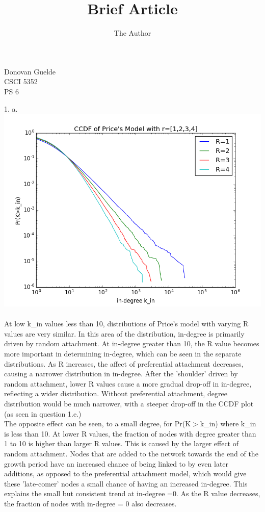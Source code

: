 \documentclass[11pt, oneside]{article}   	%
\title{Brief Article}
\author{The Author}
\begin{document}
\begin{flushright}
Donovan Guelde\\
CSCI 5352\\
PS 6\\
\end{flushright}
1. a.\\
\includegraphics[scale=0.7]{1a_plot.png}\\\\
 \indent At low k\_in values less than 10, distributions of Price's model with varying R values are very similar.  In this area of the distribution, in-degree is primarily driven by random attachment.  At in-degree greater than 10, the R value becomes more important in determining in-degree, which can be seen in the separate distributions.  As R increases, the affect of preferential attachment decreases, causing a narrower distribution in in-degree.  After the 'shoulder' driven by random attachment, lower R values cause a more gradual drop-off in in-degree, reflecting a wider distribution.  Without preferential attachment, degree distribution would be much narrower, with a steeper drop-off in the CCDF plot (as seen in question 1.e.)\\
 \indent The opposite effect can be seen, to a small degree, for Pr(K$>$k\_in) where k\_in is less than 10.  At lower R values, the fraction of nodes with degree greater than 1 to 10 is higher than larger R values.  This is caused by the larger effect of random attachment.  Nodes that are added to the network towards the end of the growth period have an increased chance of being linked to by even later additions, as opposed to the preferential attachment model, which would give these 'late-comer' nodes a small chance of having an increased in-degree.  This explains the small but consistent trend at in-degree =0.  As the R value decreases, the fraction of nodes with in-degree = 0 also decreases.\\\\\\
\end{document}
